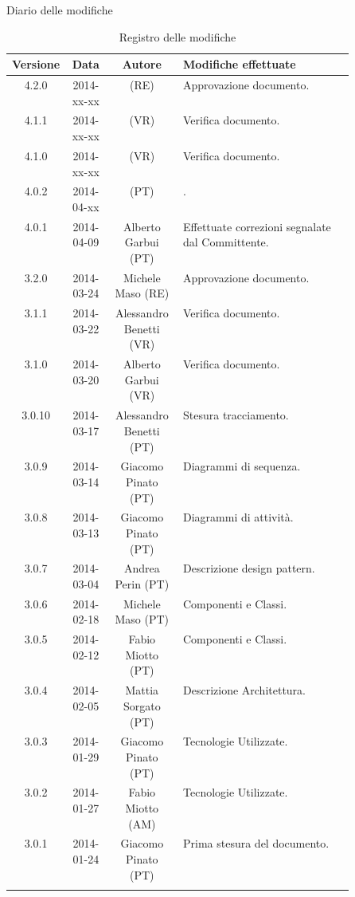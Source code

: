 
\newpage
Diario delle modifiche
\begin{center}
\begin{longtable}{|c|c|c|p{0.5\linewidth}|}
\toprule
\textbf{Versione} & \textbf{Data} & \textbf{Autore} & \textbf{Modifiche effettuate}\\

\midrule
4.2.0 & 2014-xx-xx &   (RE) & Approvazione documento.\\
\midrule
4.1.1 & 2014-xx-xx &   (VR) & Verifica documento.\\
\midrule
4.1.0 & 2014-xx-xx &   (VR) & Verifica documento.\\

\midrule
4.0.2 & 2014-04-xx &   (PT) &  .\\
\midrule
4.0.1 & 2014-04-09 & Alberto Garbui (PT) & Effettuate correzioni segnalate dal Committente.\\


\midrule
3.2.0 & 2014-03-24 & Michele Maso (RE) & Approvazione documento.\\
\midrule
3.1.1 & 2014-03-22 & Alessandro Benetti (VR) & Verifica documento.\\
\midrule
3.1.0 & 2014-03-20 & Alberto Garbui (VR) & Verifica documento.\\
\midrule
3.0.10 & 2014-03-17 & Alessandro Benetti (PT) & Stesura tracciamento.\\
\midrule
3.0.9 & 2014-03-14 & Giacomo Pinato (PT) & Diagrammi di sequenza.\\
\midrule
3.0.8 & 2014-03-13 & Giacomo Pinato (PT) & Diagrammi di attività.\\
\midrule
3.0.7 & 2014-03-04 & Andrea Perin (PT) & Descrizione design pattern.\\
\midrule
3.0.6 & 2014-02-18 & Michele Maso (PT) & Componenti e Classi.\\
\midrule
3.0.5 & 2014-02-12 & Fabio Miotto (PT) & Componenti e Classi.\\
\midrule
3.0.4 & 2014-02-05 & Mattia Sorgato (PT) & Descrizione Architettura.\\
\midrule
3.0.3 & 2014-01-29 & Giacomo Pinato (PT) & Tecnologie Utilizzate.\\
\midrule
3.0.2 & 2014-01-27 & Fabio Miotto (AM) & Tecnologie Utilizzate.\\
\midrule
3.0.1 & 2014-01-24 & Giacomo Pinato (PT) & Prima stesura del documento.\\

\bottomrule
\caption{Registro delle modifiche}
\label{tab:changelog}

\end{longtable}
\end{center}

